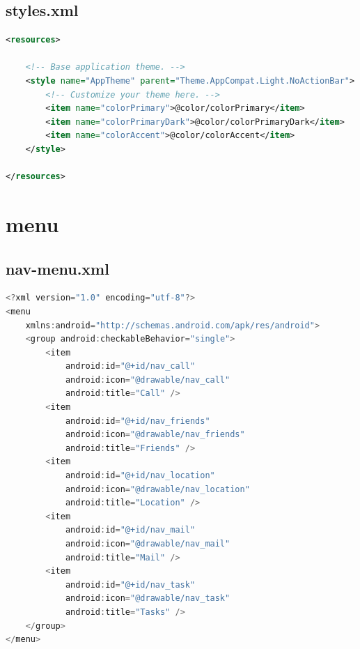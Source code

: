 \documentclass[UTF8, Microsoft YaHei]{book}
\begin{document}
    \subsection{styles.xml}
\begin{small}
\begin{lstlisting}[language=xml]
<resources>

    <!-- Base application theme. -->
    <style name="AppTheme" parent="Theme.AppCompat.Light.NoActionBar">
        <!-- Customize your theme here. -->
        <item name="colorPrimary">@color/colorPrimary</item>
        <item name="colorPrimaryDark">@color/colorPrimaryDark</item>
        <item name="colorAccent">@color/colorAccent</item>
    </style>

</resources>
\end{lstlisting}
\end{small}
    \section{menu}
    \subsection{nav-menu.xml}
\begin{small}
\begin{lstlisting}[language=java]
<?xml version="1.0" encoding="utf-8"?>
<menu
    xmlns:android="http://schemas.android.com/apk/res/android">
    <group android:checkableBehavior="single">
        <item
            android:id="@+id/nav_call"
            android:icon="@drawable/nav_call"
            android:title="Call" />
        <item
            android:id="@+id/nav_friends"
            android:icon="@drawable/nav_friends"
            android:title="Friends" />
        <item
            android:id="@+id/nav_location"
            android:icon="@drawable/nav_location"
            android:title="Location" />
        <item
            android:id="@+id/nav_mail"
            android:icon="@drawable/nav_mail"
            android:title="Mail" />
        <item
            android:id="@+id/nav_task"
            android:icon="@drawable/nav_task"
            android:title="Tasks" />
    </group>
</menu>
\end{lstlisting}
\end{small}
\end{document}
